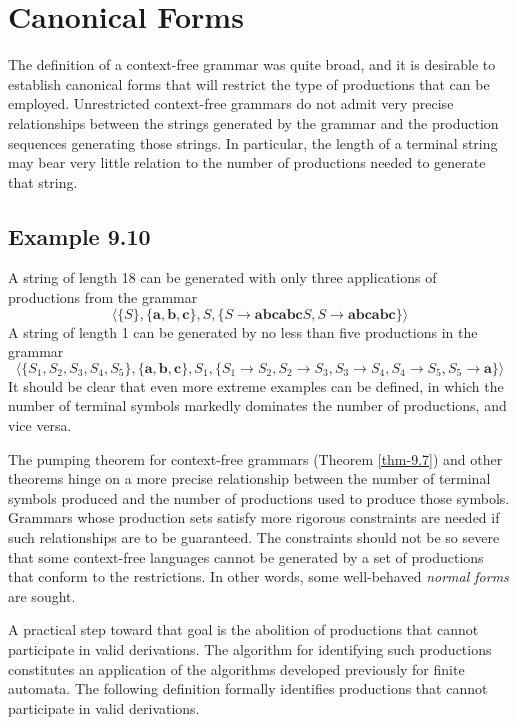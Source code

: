\section{Canonical Forms}\label{sec-9.3}

The definition of a context-free grammar was quite broad, and it is desirable
to establish canonical forms that will restrict the type of productions that can
be employed. Unrestricted context-free grammars do not admit very precise
relationships between the strings generated by the grammar and the production
sequences generating those strings. In particular, the length of a terminal
string may bear very little relation to the number of productions needed to
generate that string.

\subsection*{Example 9.10}

A string of length 18 can be generated with only three applications of
productions from the grammar
\[ \langle\{S\},\{\pmb{a},\pmb{b},\pmb{c}\},S,\{S\rightarrow\pmb{abcabc}S,S
	\rightarrow\pmb{abcabc}\}\rangle \]
A string of length 1 can be generated by no less than five productions in the
grammar
\[ \langle\{S_1,S_2,S_3,S_4,S_5\},\{\pmb{a},\pmb{b},\pmb{c}\},S_1,\{S_1\rightarrow
	S_2,S_2\rightarrow S_3,S_3\rightarrow S_4,S_4\rightarrow S_5,S_5
	\rightarrow\pmb{a}\}\rangle\]
It should be clear that even more extreme examples can be defined, in which the
number of terminal symbols markedly dominates the number of productions, and
vice versa.

The pumping theorem for context-free grammars (Theorem \ref{thm-9.7}) and other theorems
hinge on a more precise relationship between the number of terminal symbols
produced and the number of productions used to produce those symbols. Grammars
whose production sets satisfy more rigorous constraints are needed if such
relationships are to be guaranteed. The constraints should not be so severe that
some context-free languages cannot be generated by a set of productions that
conform to the restrictions. In other words, some well-behaved \emph{normal
forms} are sought.

A practical step toward that goal is the abolition of productions that cannot
participate in valid derivations. The algorithm for identifying such productions
constitutes an application of the algorithms developed previously for finite
automata. The following definition formally identifies productions that cannot
participate in valid derivations.

